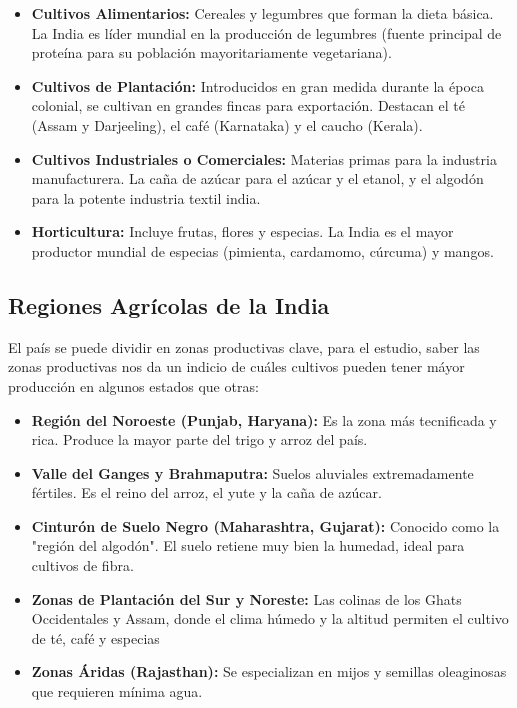 \documentclass[oneside,11pt]{Latex/Classes/PhDthesisPSnPDF}
\begin{document}
\begin{itemize}
 \item{\textbf{Cultivos Alimentarios:} Cereales y legumbres que forman la dieta básica. La India es líder mundial en la producción de legumbres (fuente principal de proteína para su población mayoritariamente vegetariana).}
 \item{\textbf{Cultivos de Plantación:} Introducidos en gran medida durante la época colonial, se cultivan en grandes fincas para exportación. Destacan el té (Assam y Darjeeling), el café (Karnataka) y el caucho (Kerala).}
 \item{\textbf{Cultivos Industriales o Comerciales:} Materias primas para la industria manufacturera. La caña de azúcar para el azúcar y el etanol, y el algodón para la potente industria textil india.}
 \item{\textbf{Horticultura:} Incluye frutas, flores y especias. La India es el mayor productor mundial de especias (pimienta, cardamomo, cúrcuma) y mangos.}
\end{itemize}

\hfill\break

\subsection{Regiones Agrícolas de la India}

El país se puede dividir en zonas productivas clave, para el estudio,
saber las zonas productivas nos da un indicio de cuáles cultivos pueden
tener máyor producción en algunos estados que otras:

\begin{itemize}

    \item{\textbf{Región del Noroeste (Punjab, Haryana):} Es la zona más tecnificada y rica. Produce la mayor parte del trigo y arroz del país.}
    \item{\textbf{Valle del Ganges y Brahmaputra:} Suelos aluviales extremadamente fértiles. Es el reino del arroz, el yute y la caña de azúcar.}
    \item{\textbf{Cinturón de Suelo Negro (Maharashtra, Gujarat):} Conocido como la "región del algodón". El suelo retiene muy bien la humedad, ideal para cultivos de fibra.}
    \item{\textbf{Zonas de Plantación del Sur y Noreste:} Las colinas de los Ghats Occidentales y Assam, donde el clima húmedo y la altitud permiten el cultivo de té, café y especias}
    \item{\textbf{Zonas Áridas (Rajasthan):} Se especializan en mijos y semillas oleaginosas que requieren mínima agua.}

\end{itemize}
\end{document}
